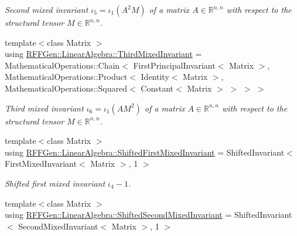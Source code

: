 \begin{DoxyCompactItemize}
\begin{DoxyCompactList}\small\item\em Second mixed invariant $ \iota_5=\iota_1(A^2M) $ of a matrix $A\in\mathbb{R}^{n,n}$ with respect to the structural tensor $M\in\mathbb{R}^{n,n}$. \end{DoxyCompactList}\item 
\hypertarget{group__LinearAlgebraGroup_gab211541411dec582511acf5b0e956864}{{\footnotesize template$<$class Matrix $>$ }\\using \hyperlink{group__LinearAlgebraGroup_gab211541411dec582511acf5b0e956864}{R\-F\-F\-Gen\-::\-Linear\-Algebra\-::\-Third\-Mixed\-Invariant} = Mathematical\-Operations\-::\-Chain$<$ First\-Principal\-Invariant$<$ Matrix $>$, Mathematical\-Operations\-::\-Product$<$ Identity$<$ Matrix $>$, Mathematical\-Operations\-::\-Squared$<$ Constant$<$ Matrix $>$ $>$ $>$ $>$}\label{group__LinearAlgebraGroup_gab211541411dec582511acf5b0e956864}

\begin{DoxyCompactList}\small\item\em Third mixed invariant $ \iota_6=\iota_1(AM^2) $ of a matrix $A\in\mathbb{R}^{n,n}$ with respect to the structural tensor $M\in\mathbb{R}^{n,n}$. \end{DoxyCompactList}\item 
\hypertarget{group__LinearAlgebraGroup_ga864cde216d56b082449e33422f7fcc76}{{\footnotesize template$<$class Matrix $>$ }\\using \hyperlink{group__LinearAlgebraGroup_ga864cde216d56b082449e33422f7fcc76}{R\-F\-F\-Gen\-::\-Linear\-Algebra\-::\-Shifted\-First\-Mixed\-Invariant} = Shifted\-Invariant$<$ First\-Mixed\-Invariant$<$ Matrix $>$, 1 $>$}\label{group__LinearAlgebraGroup_ga864cde216d56b082449e33422f7fcc76}

\begin{DoxyCompactList}\small\item\em Shifted first mixed invariant $ \iota_4 - 1 $. \end{DoxyCompactList}\item 
\hypertarget{group__LinearAlgebraGroup_ga023b3c54182be971c7d3ba9dda15fa3d}{{\footnotesize template$<$class Matrix $>$ }\\using \hyperlink{group__LinearAlgebraGroup_ga023b3c54182be971c7d3ba9dda15fa3d}{R\-F\-F\-Gen\-::\-Linear\-Algebra\-::\-Shifted\-Second\-Mixed\-Invariant} = Shifted\-Invariant$<$ Second\-Mixed\-Invariant$<$ Matrix $>$, 1 $>$}\label{group__LinearAlgebraGroup_ga023b3c54182be971c7d3ba9dda15fa3d}


\end{DoxyCompactItemize}
